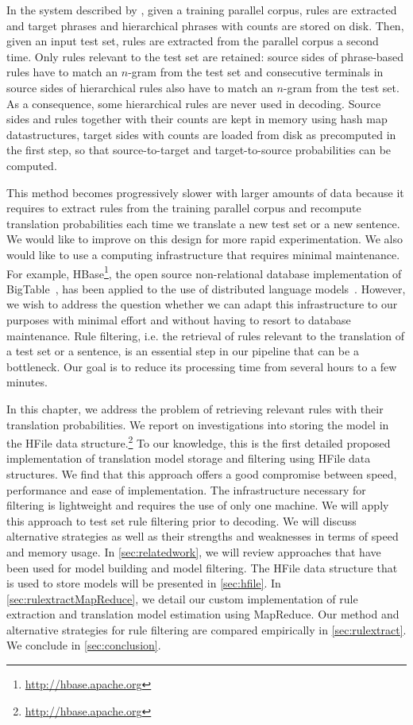 In the system
described by \citet{iglesias-degispert-banga-byrne:2009:NAACL},
given a training parallel corpus, rules are extracted and target
phrases and hierarchical phrases with counts are stored on disk.
Then, given an input test set, rules are extracted from the parallel
corpus a second time. Only rules relevant to the test set
are retained: source sides of phrase-based rules have to match
an $n$-gram from the test set and consecutive terminals
in source sides of hierarchical rules also have to match
an $n$-gram from the test set. As a consequence, some hierarchical
rules are never used in decoding. %
Source sides and rules together with their counts are kept
in memory using hash map datastructures, target sides with counts
are loaded from disk as precomputed in the first step, so that
source-to-target and target-to-source probabilities can be computed.

This
method becomes progressively slower with larger amounts of data
because it requires to extract rules from the training parallel corpus
and recompute translation probabilities
each time we translate a new test set or a new
sentence. We
would like to improve on this design for more rapid experimentation. We also would like
to use a computing infrastructure that requires minimal maintenance. For example,
HBase\footnote{\url{http://hbase.apache.org}}, the open source non-relational database
implementation of
BigTable~\citep{chang-dean-ghemawat-hsieh-wallach-burrows-chandra-fikes-gruber:2008:ACM}, has been applied to the use of distributed language
models~\citep{yu:2008:mastersthesis}. However, we wish to address the question
whether we can adapt this infrastructure to our purposes with minimal
effort and without having to resort to database maintenance.
Rule filtering, i.e. the retrieval of rules relevant to the translation
of a test set or a sentence, is an essential step in our pipeline that can be a
bottleneck. Our goal is to reduce its processing time from several hours to a
few minutes.

In this chapter, we address the problem of retrieving relevant rules with their
translation probabilities. We report on investigations into
storing the model in the HFile data
structure.\footnote{\url{http://hbase.apache.org}} To our knowledge, this is the first
detailed proposed implementation of translation model storage and
filtering using HFile data structures. We find that this approach
offers a good compromise
between speed, performance and ease of implementation. The infrastructure necessary
for filtering is lightweight and requires the use of only one machine. We will
apply this approach to test set rule filtering prior
to decoding. We will discuss alternative
strategies as well as their strengths and weaknesses in terms of speed and
memory usage. In \autoref{sec:relatedwork}, we will review approaches that
have been used for model building and model filtering.
The HFile data structure that is used to
store models will be presented in \autoref{sec:hfile}.
In \autoref{sec:rulextractMapReduce}, we detail our custom implementation
of rule extraction and translation model estimation using
MapReduce. Our method and
alternative strategies for rule filtering are compared empirically in
\autoref{sec:rulextract}. We conclude in \autoref{sec:conclusion}.

